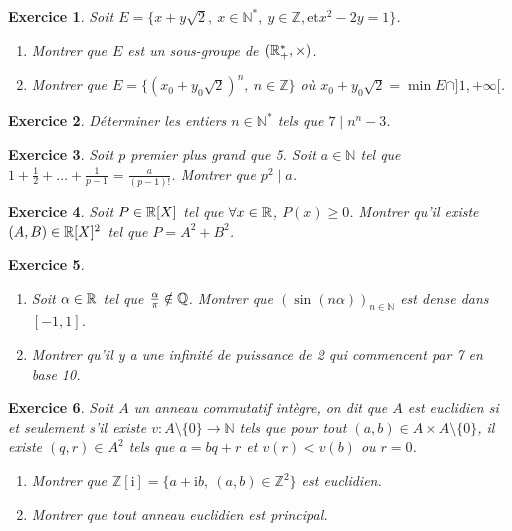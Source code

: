 \documentclass[12pt]{article}
\newtheorem{exercise}{Exercice}[section]
\theoremstyle{remark}
\theoremstyle{remark}
\newcommand{\N}{\mathbb{N}} \newcommand{\Z}{\mathbb{Z}}
\begin{document}
\begin{exercise}
	Soit $E=\{x+y\sqrt{2},~x\in\N^{*},~y\in\Z,\text{et}x^{2}-2y=1\}$.
	\begin{enumerate}
		\item
		Montrer que $E$ est un sous-groupe de $(\mathbb{R}_{+}^{*},\times)$.
		\item
		Montrer que $E=\{(x_{0}+y_{0}\sqrt{2})^{n},~n\in\Z\}$ où
		$x_{0}+y_{0}\sqrt{2}=\min E\cap]1,+\infty[$.
	\end{enumerate}
\end{exercise}

\begin{exercise}
	Déterminer les entiers $n\in\N^{*}$ tels que $7\mid n^{n}-3$.
\end{exercise}

\begin{exercise}
	Soit $p$ premier plus grand que 5. Soit $a\in\N$ tel que
	$1+\frac{1}{2}+\dots+\frac{1}{p-1}=\frac{a}{(p-1)!}$. Montrer que $p^{2}\mid
	a$.
\end{exercise}

\begin{exercise}
	Soit $P\in \mathbb{R}[X]$ tel que $\forall x\in\mathbb{R}$, $P(x)\geqslant0$. Montrer qu'il
	existe $(A,B)\in\mathbb{R}[X]^{2}$ tel que $P=A^{2}+B^{2}$.
\end{exercise}

\begin{exercise}
	\phantom{}
	\begin{enumerate}
		\item
		Soit $\alpha\in\mathbb{R}$ tel que $\frac{\alpha}{\pi}\notin\mathbb{Q}$. Montrer que
		$(\sin(n\alpha))_{n\in\N}$ est dense dans $[-1,1]$.
		\item
		Montrer qu'il y a une infinité de puissance de 2 qui commencent par 7 en
		base 10.
	\end{enumerate}
\end{exercise}

\begin{exercise}
	Soit $A$ un anneau commutatif intègre, on dit que $A$ est euclidien si et
	seulement s'il existe $v:A\setminus\{0\}\to\N$ tels que pour tout $(a,b)\in
	A\times A\setminus\{0\}$, il existe $(q,r)\in A^{2}$ tels que $a=bq+r$ et
	$v(r)<v(b)$ ou $r=0$.
	\begin{enumerate}
		\item
		Montrer que $\Z[\mathrm{i}]=\{a+\mathrm{i}b,~(a,b)\in\Z^{2}\}$ est
		euclidien.
		\item
		Montrer que tout anneau euclidien est principal.
	\end{enumerate}
\end{exercise}
\end{document}
